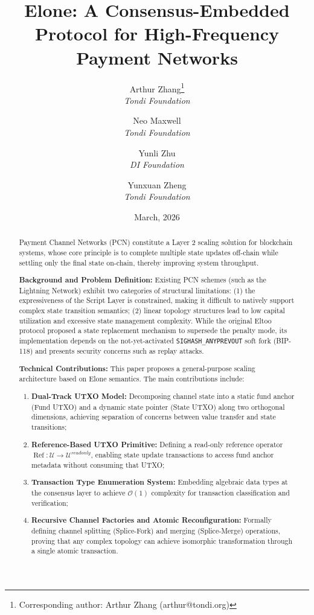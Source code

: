 \documentclass[11pt,a4paper]{article}
\title{Elone: A Consensus-Embedded Protocol for High-Frequency Payment Networks}
\author{
    Arthur Zhang\thanks{Corresponding author: Arthur Zhang (arthur@tondi.org)} \\
    \textit{Tondi Foundation}
    \and
    Neo Maxwell \\
    \textit{Tondi Foundation}
    \and
    Yunli Zhu \\
    \textit{DI Foundation}
    \and
    Yunxuan Zheng \\
    \textit{Tondi Foundation}
}
\date{March, 2026}
\newcommand{\calU}{\mathcal{U}}
\newcommand{\RefOp}{\operatorname{Ref}}
\newcommand{\bigO}{\mathcal{O}} %
\begin{document}
\maketitle

\begin{abstract}
Payment Channel Networks (PCN) constitute a Layer 2 scaling solution for blockchain systems, whose core principle is to complete multiple state updates off-chain while settling only the final state on-chain, thereby improving system throughput.

\textbf{Background and Problem Definition:} Existing PCN schemes (such as the Lightning Network) exhibit two categories of structural limitations: (1) the expressiveness of the Script Layer is constrained, making it difficult to natively support complex state transition semantics; (2) linear topology structures lead to low capital utilization and excessive state management complexity. While the original Eltoo protocol proposed a state replacement mechanism to supersede the penalty mode, its implementation depends on the not-yet-activated \texttt{SIGHASH\_ANYPREVOUT} soft fork (BIP-118) and presents security concerns such as replay attacks.

\textbf{Technical Contributions:} This paper proposes a general-purpose scaling architecture based on Elone semantics. The main contributions include:
\begin{enumerate}
    \item \textbf{Dual-Track UTXO Model:} Decomposing channel state into a static fund anchor (Fund UTXO) and a dynamic state pointer (State UTXO) along two orthogonal dimensions, achieving separation of concerns between value transfer and state transitions;
    \item \textbf{Reference-Based UTXO Primitive:} Defining a read-only reference operator $\RefOp: \calU \to \calU^{readonly}$, enabling state update transactions to access fund anchor metadata without consuming that UTXO;
    \item \textbf{Transaction Type Enumeration System:} Embedding algebraic data types at the consensus layer to achieve $\bigO(1)$ complexity for transaction classification and verification;
    \item \textbf{Recursive Channel Factories and Atomic Reconfiguration:} Formally defining channel splitting (Splice-Fork) and merging (Splice-Merge) operations, proving that any complex topology can achieve isomorphic transformation through a single atomic transaction.
\end{enumerate}


\end{abstract}
\end{document}
